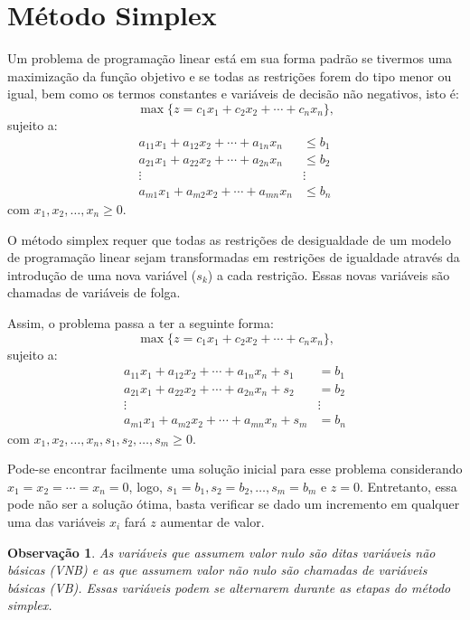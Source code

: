\documentclass[
	12pt,				%
	openright,			%
	twoside,			%
	a4paper,			%
	english,			%
	french,				%
	brazil,				%
	sumario=tradicional
]{abntex2}
\newtheorem{remark}{Observação}
\numberwithin{example}{chapter}
\numberwithin{remark}{chapter}
\numberwithin{definition}{chapter}
\numberwithin{figure}{chapter}
\begin{document}
\section{Método Simplex}

Um problema de programação linear está em sua forma padrão se tivermos uma maximização da função objetivo e se todas as restrições forem do tipo menor ou igual, bem como os termos constantes e variáveis de decisão não negativos, isto é:
$$\max \{z=c_1 x_1+c_2 x_2+\cdots+c_n x_n\}\text{,}$$
sujeito a:
\begin{align*}
    a_{11}x_1 + a_{12}x_2 + \cdots + a_{1n}x_n & \leqslant b_1\\
    a_{21}x_1 + a_{22}x_2 + \cdots + a_{2n}x_n & \leqslant b_2\\
    \vdots \hspace{100pt} & \vdots\\
    a_{m1}x_1 + a_{m2}x_2 + \cdots + a_{mn}x_n & \leqslant b_n
\end{align*}
com $x_1, x_2, \dots, x_n \geqslant 0$.

O método simplex requer que todas as restrições de desigualdade de um modelo de programação linear sejam transformadas em restrições de igualdade através da introdução de uma nova variável ($s_k$) a cada restrição. Essas novas variáveis são chamadas de variáveis de folga.

Assim, o problema passa a ter a seguinte forma:
$$\max\{z=c_1 x_1 + c_2 x_2 + \cdots + c_n x_n \}\text{,}$$
sujeito a:
\begin{align*}
    a_{11}x_1 + a_{12}x_2 + \cdots + a_{1n}x_n + s_1 & = b_1\\
    a_{21}x_1 + a_{22}x_2 + \cdots + a_{2n}x_n + s_2 & = b_2\\
    \vdots \hspace{100pt} & \vdots\\
    a_{m1}x_1 + a_{m2}x_2 + \cdots + a_{mn}x_n + s_m & = b_n
\end{align*}
com $x_1, x_2, \dots, x_n, s_1, s_2, \dots, s_m \geqslant 0$.

Pode-se encontrar facilmente uma solução inicial para esse problema considerando $x_1=x_2=\cdots=x_n=0$, logo, $s_1=b_1,s_2=b_2,\dots,s_m=b_m$ e $z=0$. Entretanto, essa pode não ser a solução ótima, basta verificar se dado um incremento em qualquer uma das variáveis $x_i$ fará $z$ aumentar de valor.

\begin{remark}
    As variáveis que assumem valor nulo são ditas variáveis não básicas (VNB) e as que assumem valor não nulo são chamadas de variáveis básicas (VB). Essas variáveis podem se alternarem durante as etapas do método simplex.
\end{remark}
\end{document}
